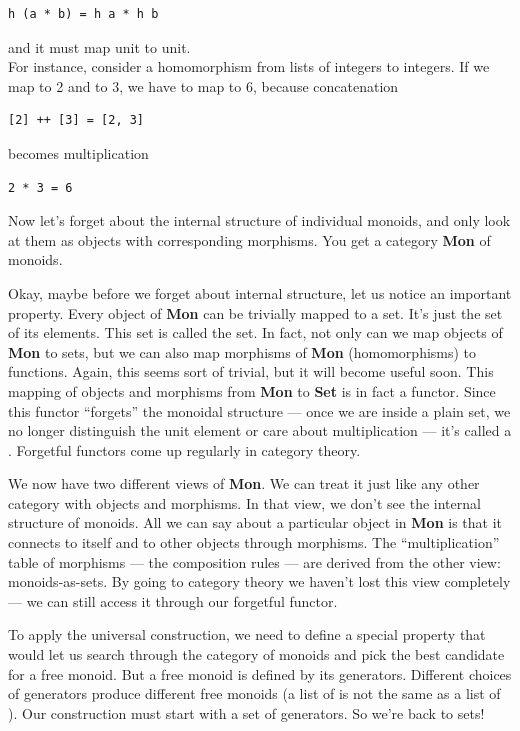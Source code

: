 \begin{verbatim}
h (a * b) = h a * h b
\end{verbatim}

and it must map unit to unit.\\
For instance, consider a homomorphism from lists of integers to
integers. If we map \code{{[}2{]}} to 2 and \code{{[}3{]}} to 3, we
have to map \code{{[}2,\ 3{]}} to 6, because concatenation

\begin{verbatim}
[2] ++ [3] = [2, 3]
\end{verbatim}

becomes multiplication

\begin{verbatim}
2 * 3 = 6
\end{verbatim}

Now let's forget about the internal structure of individual monoids, and
only look at them as objects with corresponding morphisms. You get a
category \textbf{Mon} of monoids.

Okay, maybe before we forget about internal structure, let us notice an
important property. Every object of \textbf{Mon} can be trivially mapped
to a set. It's just the set of its elements. This set is called the
 set. In fact, not only can we map objects of
\textbf{Mon} to sets, but we can also map morphisms of \textbf{Mon}
(homomorphisms) to functions. Again, this seems sort of trivial, but it
will become useful soon. This mapping of objects and morphisms from
\textbf{Mon} to \textbf{Set} is in fact a functor. Since this functor
``forgets'' the monoidal structure --- once we are inside a plain set,
we no longer distinguish the unit element or care about multiplication
--- it's called a . Forgetful functors come up
regularly in category theory.

We now have two different views of \textbf{Mon}. We can treat it just
like any other category with objects and morphisms. In that view, we
don't see the internal structure of monoids. All we can say about a
particular object in \textbf{Mon} is that it connects to itself and to
other objects through morphisms. The ``multiplication'' table of
morphisms --- the composition rules --- are derived from the other view:
monoids-as-sets. By going to category theory we haven't lost this view
completely --- we can still access it through our forgetful functor.

To apply the universal construction, we need to define a special
property that would let us search through the category of monoids and
pick the best candidate for a free monoid. But a free monoid is defined
by its generators. Different choices of generators produce different
free monoids (a list of  is not the same as a list of
). Our construction must start with a set of generators. So
we're back to sets!

